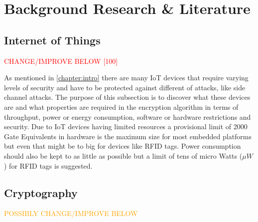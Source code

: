 \documentclass[12pt,twoside,a4paper]{report}
\begin{document}
	\chapter{Background Research \& Literature}
	\label{chapter:BACK}
    
	\section{Internet of Things}
	\label{section:IoT}
    
	\textcolor{red}{CHANGE/IMPROVE BELOW [100]}
    
	As mentioned in \autoref{chapter:intro} there are many IoT devices that require varying levels of security and have to be protected against different of attacks, like side channel attacks. The purpose of this subsection is to discover what these devices are and what properties are required in the encryption algorithm in terms of throughput, power or energy consumption, software or hardware restrictions and security. Due to IoT devices having limited resources a provisional limit of 2000 Gate Equivalents in hardware is the maximum size for most embedded platforms but even that might be to big for devices like RFID tags\cite{Juels2005}. Power consumption should also be kept to as little as possible but a limit of tens of micro Watts ($\mu W$) for RFID tags is suggested\cite{David2011}.
    
	\section{Cryptography}
	\label{section:crypt}
    
	\textcolor{orange}{POSSIBLY CHANGE/IMPROVE BELOW}
    
\end{document}
